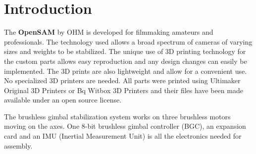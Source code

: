 \chapter{Introduction}


The \textbf{\textsf{OpenSAM}} by OHM is developed for filmmaking amateurs and professionals. The technology used allows a broad spectrum of cameras of varying sizes and weights to be stabilized. The unique use of 3D printing technology for the custom parts allows easy reproduction and any design changes can easily be implemented. The 3D prints are also lightweight and allow for a convenient use. No specialized 3D printers are needed. All parts were printed using Ultimaker Original 3D Printers or Bq Witbox 3D Printers and their files have been made available under an open source license.\par
The brushless gimbal stabilization system works on three brushless motors moving on the axes. One 8-bit brushless gimbal controller (BGC), an expansion card and an IMU (Inertial Measurement Unit) is all the electronics needed for assembly.


